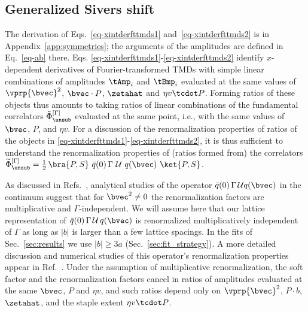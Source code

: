 \subsection{Generalized Sivers shift}
\label{sec:sivers_shift_amplitudes}
The derivation of Eqs.~\eqref{eq-xintderfttmds1} and~\eqref{eq-xintderfttmds2} is in Appendix~\ref{app:symmetries}; the arguments of the amplitudes are defined in Eq.~\eqref{eq-ab} there. Eqs. \eqref{eq-xintderfttmds1}-\eqref{eq-xintderfttmds2} identify $x$-dependent derivatives of Fourier-transformed TMDs with simple linear combinations of amplitudes $\tAmp_i$ and $\tBmp_i$ evaluated at the same values of $\vprp{\bvec}^2$, $\bvec \cdot P$, $\zetahat$ and $\eta v \tcdot P$. Forming ratios of these objects thus amounts to taking ratios of linear combinations of the fundamental correlators $\tilde \Phi^{[\Gamma]}_\unsub$ evaluated at the same point, i.e., with the same values of $\bvec$, $P$, and $\eta v$. For a discussion of the renormalization properties of ratios of the objects in \eqref{eq-xintderfttmds1}-\eqref{eq-xintderfttmds2}, it is thus sufficient to understand the renormalization properties of (ratios formed from) the correlators $\widetilde \Phi^{[\Gamma]}_\unsub = \frac{1}{2} \, \bra{P, S}\ \bar{q}(0)\, \Gamma\ \mathcal{U}\ q(\bvec)\ \ket{P, S} $.

As discussed in Refs.~\cite{Musch:2011er, Yoon:2017qzo}, analytical studies of the operator $\bar{q}(0)\, \Gamma\, \mathcal{U} q(\bvec)$ in the continuum suggest that for $\bvec^2 \neq 0$ the renormalization factors are multiplicative and $\Gamma$-independent. We will assume here that our lattice representation of $\bar{q}(0)\, \Gamma\, \mathcal{U}\, q(\bvec)$ is renormalized multiplicatively independent of $\Gamma$ as long as $|b|$ is larger than a few lattice spacings. In the fits of Sec.~\ref{sec:results} we use $|b|\ge 3a$ (Sec.~\ref{sec:fit_strategy}). A more detailed discussion and numerical studies of this operator's renormalization properties appear in Ref.~\cite{Musch:2010ka}. Under the assumption of multiplicative renormalization, the soft factor and the renormalization factors cancel in ratios of amplitudes evaluated at the same $\bvec$, $P$ and $\eta v$, and such ratios depend only on $\vprp{\bvec}^2$, $P\cdot b$, $\zetahat$, and the staple extent $\eta v \tcdot P$.

